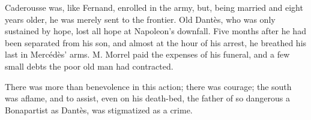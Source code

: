  Caderousse was, like Fernand, enrolled in the army, but, being married and eight years older, he was merely sent to the frontier. Old Dantès, who was only sustained by hope, lost all hope at Napoleon's downfall. Five months after he had been separated from his son, and almost at the hour of his arrest, he breathed his last in Mercédès' arms. M. Morrel paid the expenses of his funeral, and a few small debts the poor old man had contracted. 

 There was more than benevolence in this action; there was courage; the south was aflame, and to assist, even on his death-bed, the father of so dangerous a Bonapartist as Dantès, was stigmatized as a crime. 
